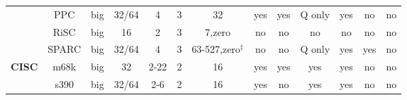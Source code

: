 \begin{sidewaystable}[tbp]
\begin{sf}
\begin{footnotesize}
\begin{center}
\begin{tabular}{|c|c||c|c|c|c|c|c|c|c|c|c|c|}
                 & %
PPC              & %
big              & %
32/64            & %
4                & %
3                & %
32               & %
yes              & %
yes              & %
Q only           & %
yes              & %
no               & %
no                 %
\\
\cline{2-13}

                 & %
RiSC             & %
big              & %
16               & %
2                & %
3                & %
7,zero           & %
no               & %
no               & %
no               & %
no               & %
no               & %
no                 %
\\
\cline{2-13}

                 & %
SPARC            & %
big              & %
32/64            & %
4                & %
3                & %
63-527,zero$^{\ddagger}$ & %
no               & %
no               & %
Q only           & %
yes              & %
yes              & %
no                 %
\\

\hline\hline


\multirow{5}{*}{\bf CISC} &
m68k             & %
big              & %
32               & %
2-22             & %
2                & %
16               & %
yes              & %
yes              & %
yes              & %
yes              & %
no               & %
no                 %
\\
\cline{2-13}

		 & %
s390             & %
big              & %
32/64            & %
2-6              & %
2                & %
16               & %
yes              & %
no               & %
yes              & %
yes              & %
no               & %
no                 %
\\
\cline{2-13}


\end{tabular}
\end{center}
\end{footnotesize}
\end{sf}
\end{sidewaystable}
